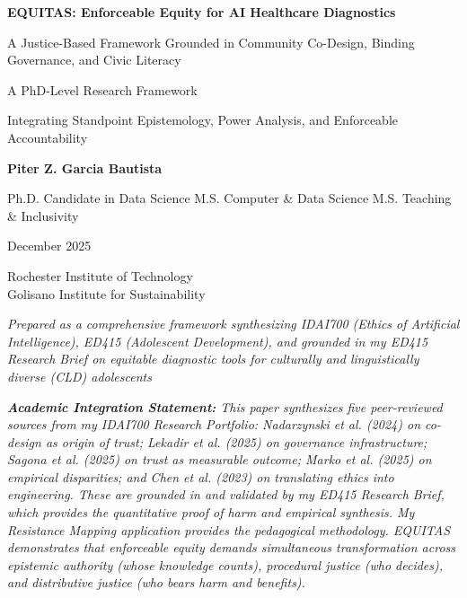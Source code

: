 \documentclass[12pt,a4paper]{article}
\begin{document}
\begin{titlepage}
\centering
\vspace*{2.5cm}

{\Large \textbf{EQUITAS: Enforceable Equity for AI Healthcare Diagnostics}}

\vspace{0.6cm}

{\large A Justice-Based Framework Grounded in Community Co-Design, Binding Governance, and Civic Literacy}

\vspace{1.6cm}

{\normalsize A PhD-Level Research Framework}

\vspace{1.6cm}

{\normalsize Integrating Standpoint Epistemology, Power Analysis, and Enforceable Accountability}

\vspace{2.4cm}

{\large \textbf{Piter Z. Garcia Bautista} \par}
{\large Ph.D. Candidate in Data Science \textbullet{} M.S. Computer \& Data Science \textbullet{} M.S. Teaching \& Inclusivity}

\vspace{0.3cm}

{\normalsize December 2025}

\vspace{2.5cm}

{\small Rochester Institute of Technology \\ Golisano Institute for Sustainability}

\vfill

{
\footnotesize \textit{Prepared as a comprehensive framework synthesizing IDAI700 (Ethics of Artificial Intelligence), ED415 (Adolescent Development), and grounded in my ED415 Research Brief on equitable diagnostic tools for culturally and linguistically diverse (CLD) adolescents} \\

\vspace{0.3cm}

\textit{\tiny\textbf{Academic Integration Statement:} This paper synthesizes five peer-reviewed sources from my IDAI700 Research Portfolio: Nadarzynski et al. (2024) on co-design as origin of trust; Lekadir et al. (2025) on governance infrastructure; Sagona et al. (2025) on trust as measurable outcome; Marko et al. (2025) on empirical disparities; and Chen et al. (2023) on translating ethics into engineering. These are grounded in and validated by my ED415 Research Brief, which provides the quantitative proof of harm and empirical synthesis. My Resistance Mapping application provides the pedagogical methodology. EQUITAS demonstrates that enforceable equity demands simultaneous transformation across epistemic authority (whose knowledge counts), procedural justice (who decides), and distributive justice (who bears harm and benefits).}
}

\end{titlepage}
\end{document}
